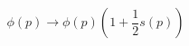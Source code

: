 \begin{equation}
\phi (p) \longrightarrow \phi (p) \left( 1 + \frac{1}{2} s(p) \right)
\label{change}
\end{equation}

